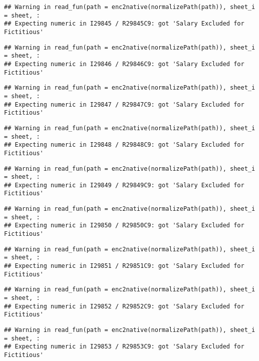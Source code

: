 \documentclass[
]{article}
\begin{document}
\begin{verbatim}
## Warning in read_fun(path = enc2native(normalizePath(path)), sheet_i = sheet, :
## Expecting numeric in I29845 / R29845C9: got 'Salary Excluded for Fictitious'
\end{verbatim}

\begin{verbatim}
## Warning in read_fun(path = enc2native(normalizePath(path)), sheet_i = sheet, :
## Expecting numeric in I29846 / R29846C9: got 'Salary Excluded for Fictitious'
\end{verbatim}

\begin{verbatim}
## Warning in read_fun(path = enc2native(normalizePath(path)), sheet_i = sheet, :
## Expecting numeric in I29847 / R29847C9: got 'Salary Excluded for Fictitious'
\end{verbatim}

\begin{verbatim}
## Warning in read_fun(path = enc2native(normalizePath(path)), sheet_i = sheet, :
## Expecting numeric in I29848 / R29848C9: got 'Salary Excluded for Fictitious'
\end{verbatim}

\begin{verbatim}
## Warning in read_fun(path = enc2native(normalizePath(path)), sheet_i = sheet, :
## Expecting numeric in I29849 / R29849C9: got 'Salary Excluded for Fictitious'
\end{verbatim}

\begin{verbatim}
## Warning in read_fun(path = enc2native(normalizePath(path)), sheet_i = sheet, :
## Expecting numeric in I29850 / R29850C9: got 'Salary Excluded for Fictitious'
\end{verbatim}

\begin{verbatim}
## Warning in read_fun(path = enc2native(normalizePath(path)), sheet_i = sheet, :
## Expecting numeric in I29851 / R29851C9: got 'Salary Excluded for Fictitious'
\end{verbatim}

\begin{verbatim}
## Warning in read_fun(path = enc2native(normalizePath(path)), sheet_i = sheet, :
## Expecting numeric in I29852 / R29852C9: got 'Salary Excluded for Fictitious'
\end{verbatim}

\begin{verbatim}
## Warning in read_fun(path = enc2native(normalizePath(path)), sheet_i = sheet, :
## Expecting numeric in I29853 / R29853C9: got 'Salary Excluded for Fictitious'
\end{verbatim}
\end{document}

